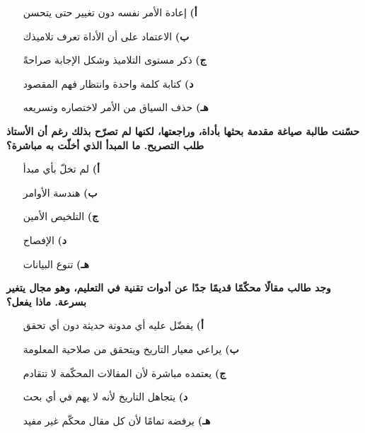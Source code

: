 \documentclass[11pt,a4paper]{article}
\begin{document}
\begin{multicols}{2}
\begin{minipage}{\linewidth}
\begin{itemize}[leftmargin=0.95cm, labelsep=4pt, itemsep=0pt, topsep=2pt, parsep=0pt]
  \item[\textbf{أ)}] إعادة الأمر نفسه دون تغيير حتى يتحسن
  \item[\textbf{ب)}] الاعتماد على أن الأداة تعرف تلاميذك
  \item[\textbf{ج)}] ذكر مستوى التلاميذ وشكل الإجابة صراحةً
  \item[\textbf{د)}] كتابة كلمة واحدة وانتظار فهم المقصود
  \item[\textbf{هـ)}] حذف السياق من الأمر لاختصاره وتسريعه
\end{itemize}
\end{minipage}\par\vspace{7pt plus 4pt}
\noindent\begin{minipage}{\linewidth}
\hangindent=0.7cm\textbf{حسّنت طالبة صياغة مقدمة بحثها بأداة، وراجعتها، لكنها لم تصرّح بذلك رغم أن الأستاذ طلب التصريح. ما المبدأ الذي أخلّت به مباشرة؟}
\begin{itemize}[leftmargin=0.95cm, labelsep=4pt, itemsep=0pt, topsep=2pt, parsep=0pt]
  \item[\textbf{أ)}] لم تخلّ بأي مبدأ
  \item[\textbf{ب)}] هندسة الأوامر
  \item[\textbf{ج)}] التلخيص الأمين
  \item[\textbf{د)}] الإفصاح
  \item[\textbf{هـ)}] تنوع البيانات
\end{itemize}
\end{minipage}\par\vspace{7pt plus 4pt}
\noindent\begin{minipage}{\linewidth}
\hangindent=0.7cm\textbf{وجد طالب مقالًا محكّمًا قديمًا جدًا عن أدوات تقنية في التعليم، وهو مجال يتغير بسرعة. ماذا يفعل؟}
\begin{itemize}[leftmargin=0.95cm, labelsep=4pt, itemsep=0pt, topsep=2pt, parsep=0pt]
  \item[\textbf{أ)}] يفضّل عليه أي مدونة حديثة دون أي تحقق
  \item[\textbf{ب)}] يراعي معيار التاريخ ويتحقق من صلاحية المعلومة
  \item[\textbf{ج)}] يعتمده مباشرة لأن المقالات المحكّمة لا تتقادم
  \item[\textbf{د)}] يتجاهل التاريخ لأنه لا يهم في أي بحث
  \item[\textbf{هـ)}] يرفضه تمامًا لأن كل مقال محكّم غير مفيد
\end{itemize}
\end{minipage}\par\vspace{7pt plus 4pt}
\end{multicols}
\end{document}
